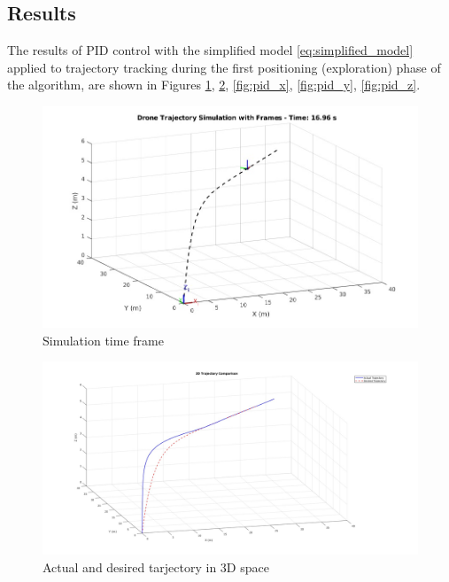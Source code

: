 \subsection{Results}
The results of PID control with the simplified model \eqref{eq:simplified_model}
applied to trajectory tracking during the first positioning 
(exploration) phase of the algorithm, are shown in  Figures
\ref{fig:pid_sim}, \ref{fig:pd_traj_comparison}, \ref{fig:pid_x},
\ref{fig:pid_y}, \ref{fig:pid_z}.
\begin{figure}[h!]
    \centering
     \includegraphics[width=1\textwidth]{images/pd_sim.jpg}
    \caption[Caption for Figure 1]{Simulation time frame}
    \label{fig:pid_sim}
\end{figure}
\begin{figure}[h!]
    \centering
     \includegraphics[width=1\textwidth]{images/pd_traj_comparison.jpg}
    \caption[Caption for Figure 2]{Actual and desired tarjectory in 3D space}
    \label{fig:pd_traj_comparison}
\end{figure}
